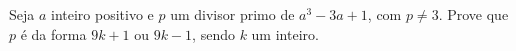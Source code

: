 Seja $a$ inteiro positivo e $p$ um divisor primo de $a^3-3a+1$, com $p \neq 3$. Prove que $p$ é da forma $9k+1$ ou $9k-1$, sendo $k$ um inteiro.